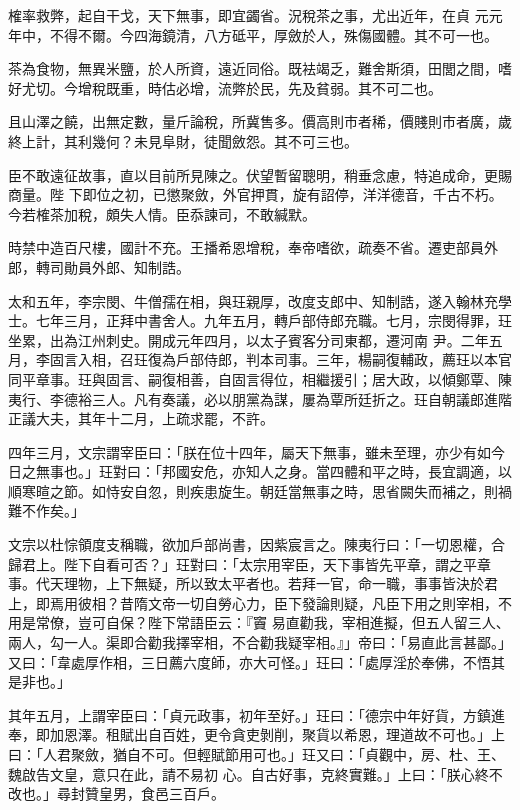 \begin{pinyinscope}
 榷率救弊，起自干戈，天下無事，即宜蠲省。況稅茶之事，尤出近年，在貞
 元元年中，不得不爾。今四海鏡清，八方砥平，厚斂於人，殊傷國體。其不可一也。



 茶為食物，無異米鹽，於人所資，遠近同俗。既袪竭乏，難舍斯須，田閭之間，嗜好尤切。今增稅既重，時估必增，流弊於民，先及貧弱。其不可二也。



 且山澤之饒，出無定數，量斤論稅，所冀售多。價高則市者稀，價賤則市者廣，歲終上計，其利幾何？未見阜財，徒聞斂怨。其不可三也。



 臣不敢遠征故事，直以目前所見陳之。伏望暫留聰明，稍垂念慮，特追成命，更賜商量。陛
 下即位之初，已懲聚斂，外官押貫，旋有詔停，洋洋德音，千古不朽。今若榷茶加稅，頗失人情。臣忝諫司，不敢緘默。



 時禁中造百尺樓，國計不充。王播希恩增稅，奉帝嗜欲，疏奏不省。遷吏部員外郎，轉司勛員外郎、知制誥。



 太和五年，李宗閔、牛僧孺在相，與玨親厚，改度支郎中、知制誥，遂入翰林充學士。七年三月，正拜中書舍人。九年五月，轉戶部侍郎充職。七月，宗閔得罪，玨坐累，出為江州刺史。開成元年四月，以太子賓客分司東都，遷河南
 尹。二年五月，李固言入相，召玨復為戶部侍郎，判本司事。三年，楊嗣復輔政，薦玨以本官同平章事。玨與固言、嗣復相善，自固言得位，相繼援引；居大政，以傾鄭覃、陳夷行、李德裕三人。凡有奏議，必以朋黨為謀，屢為覃所廷折之。玨自朝議郎進階正議大夫，其年十二月，上疏求罷，不許。



 四年三月，文宗謂宰臣曰：「朕在位十四年，屬天下無事，雖未至理，亦少有如今日之無事也。」玨對曰：「邦國安危，亦知人之身。當四體和平之時，長宜調適，以
 順寒暄之節。如恃安自忽，則疾患旋生。朝廷當無事之時，思省闕失而補之，則禍難不作矣。」



 文宗以杜悰領度支稱職，欲加戶部尚書，因紫宸言之。陳夷行曰：「一切恩權，合歸君上。陛下自看可否？」玨對曰：「太宗用宰臣，天下事皆先平章，謂之平章事。代天理物，上下無疑，所以致太平者也。若拜一官，命一職，事事皆決於君上，即焉用彼相？昔隋文帝一切自勞心力，臣下發論則疑，凡臣下用之則宰相，不用是常僚，豈可自保？陛下常語臣云：『竇
 易直勸我，宰相進擬，但五人留三人、兩人，勾一人。渠即合勸我擇宰相，不合勸我疑宰相。』」帝曰：「易直此言甚鄙。」又曰：「韋處厚作相，三日薦六度師，亦大可怪。」玨曰：「處厚淫於奉佛，不悟其是非也。」



 其年五月，上謂宰臣曰：「貞元政事，初年至好。」玨曰：「德宗中年好貨，方鎮進奉，即加恩澤。租賦出自百姓，更令貪吏剝削，聚貨以希恩，理道故不可也。」上曰：「人君聚斂，猶自不可。但輕賦節用可也。」玨又曰：「貞觀中，房、杜、王、魏啟告文皇，意只在此，請不易初
 心。自古好事，克終實難。」上曰：「朕心終不改也。」尋封贊皇男，食邑三百戶。




\end{pinyinscope}
